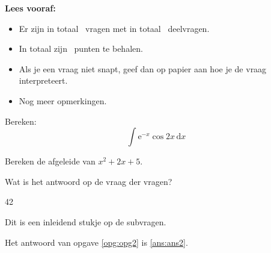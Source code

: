 \documentclass[12pt,dutch,addpoints]{tisdexam}
\begin{document}
\makecoverpage


\textbf{Lees vooraf:}
\begin{itemize}
\item Er zijn in totaal \numquestions\ vragen met in totaal \numparts\ deelvragen.
\item In totaal zijn \numpoints\ punten te behalen.
\item Als je een vraag niet snapt, geef dan op papier aan hoe je de vraag interpreteert.
\item Nog meer opmerkingen.
\end{itemize}

\hrulefill

\begin{questions}


\question[5]
Bereken: \[\int \mathrm{e}^{-x}\cos 2x \, \mathrm{d}x\]

\question[5]
Bereken de afgeleide van $x^2+2x+5$.

\question[2]
\label{opg:opg2}
Wat is het antwoord op de vraag der vragen?
\begin{choices}
\CorrectChoice \label{ans:ans2} 42
\end{choices}

\question
Dit is een inleidend stukje op de subvragen.

\end{questions}

\hrulefill

Het antwoord van opgave \ref{opg:opg2} is \ref{ans:ans2}.
\end{document}
